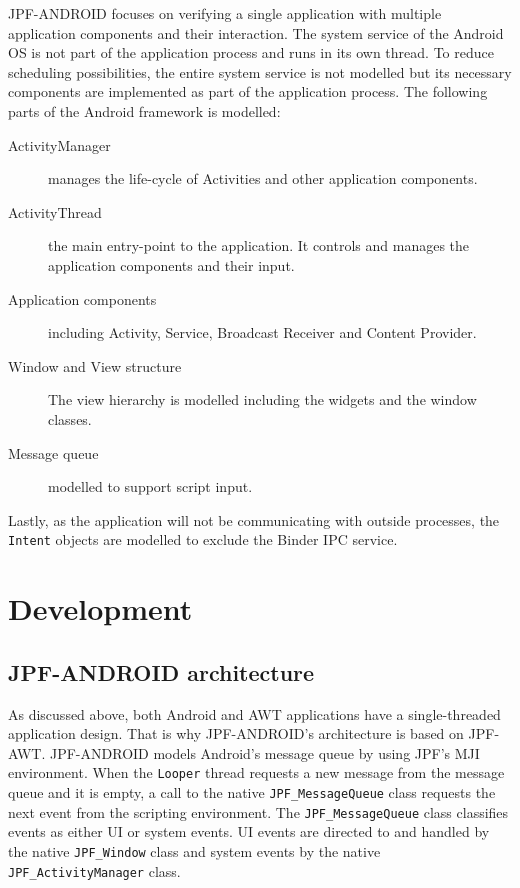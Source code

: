 \documentclass{acm_proc_article-sp}
\begin{document}
JPF-ANDROID focuses on verifying a single application with multiple application components and their interaction. The system service of
the Android OS is not part of the application process and runs in its own thread. To reduce scheduling possibilities, the entire system
service is not modelled but its necessary components are implemented as part of the application process. The following parts of the Android
framework is modelled:
\vspace{-10pt}
\begin{description}
 \item [ActivityManager]  manages the life-cycle of Activities and other application components.
 \item [ActivityThread]   the main entry-point to the application. It controls and manages the application components and their input.
 \item [Application components] including Activity, Service, Broadcast Receiver and Content Provider. 
 \item [Window and View structure] The view hierarchy is modelled including the widgets and the window classes.
 \item [Message queue] modelled to support script input.
\end{description}
\vspace{-5pt}
Lastly, as the application will not be communicating with outside processes, the \texttt{Intent} objects are modelled to exclude the
Binder IPC service.

\section{Development}
\subsection{JPF-ANDROID architecture}
As discussed above, both Android and AWT applications have a single-threaded application design. That is why JPF-ANDROID's architecture
is based on JPF-AWT. JPF-ANDROID models Android's message queue by using JPF's MJI
environment. When the \texttt{Looper} thread requests a new message from the message queue and it is empty, a call to the native
\texttt{JPF\_MessageQueue} class requests the next event from the scripting environment. The \texttt{JPF\_MessageQueue} class classifies
events as either UI or system events. UI events are directed to and handled by the native \texttt{JPF\_Window} class and system events by
the native \texttt{JPF\_ActivityManager} class.
\end{document}
